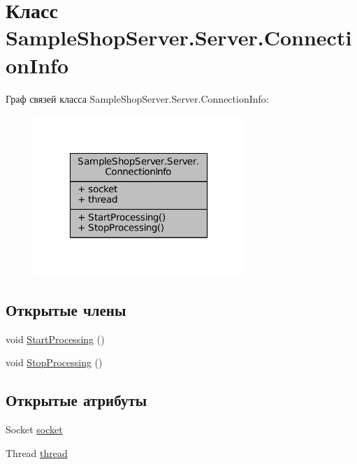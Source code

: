 \hypertarget{class_sample_shop_server_1_1_server_1_1_connection_info}{}\section{Класс Sample\+Shop\+Server.\+Server.\+Connection\+Info}
\label{class_sample_shop_server_1_1_server_1_1_connection_info}


Граф связей класса Sample\+Shop\+Server.\+Server.\+Connection\+Info\+:
\nopagebreak
\begin{figure}[H]
\begin{center}
\leavevmode
\includegraphics[width=226pt]{class_sample_shop_server_1_1_server_1_1_connection_info__coll__graph}
\end{center}
\end{figure}
\subsection*{Открытые члены}
\begin{DoxyCompactItemize}
\item 
void \hyperlink{class_sample_shop_server_1_1_server_1_1_connection_info_ab34789e8953fa64610d6f224d93900fb}{Start\+Processing} ()
\item 
void \hyperlink{class_sample_shop_server_1_1_server_1_1_connection_info_ac930b1f49814b10680503a28f7fac75a}{Stop\+Processing} ()
\end{DoxyCompactItemize}
\subsection*{Открытые атрибуты}
\begin{DoxyCompactItemize}
\item 
Socket \hyperlink{class_sample_shop_server_1_1_server_1_1_connection_info_aabe5d2005189b697b01bac2941174747}{socket}
\item 
Thread \hyperlink{class_sample_shop_server_1_1_server_1_1_connection_info_ad458ebf495f37e6bf462c7c6bae85196}{thread}
\end{DoxyCompactItemize}


